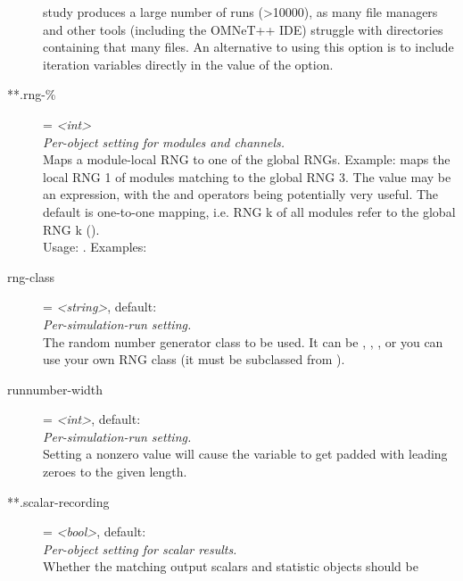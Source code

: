 \begin{description}
    study produces a large number of runs (>10000), as many file managers and
    other tools (including the OMNeT++ IDE) struggle with directories
    containing that many files. An alternative to using this option is to
    include iteration variables directly in the value of the
     option.
\item[**.rng-\%] = \textit{<int>}\\
    \textit{Per-object setting for modules and channels.}\\
    Maps a module-local RNG to one of the global RNGs. Example:
    maps the local RNG 1 of modules matching  to the
    global RNG 3. The value may be an expression, with the  and
     operators being potentially very useful. The
    default is one-to-one mapping, i.e. RNG k of all modules refer to the
    global RNG k ().\\
    Usage:
    .
    Examples:
\item[rng-class] = \textit{<string>}, default: \\
    \textit{Per-simulation-run setting.}\\
    The random number generator class to be used. It can be
    , , , or you can use
    your own RNG class (it must be subclassed from ).
\item[runnumber-width] = \textit{<int>}, default: \\
    \textit{Per-simulation-run setting.}\\
    Setting a nonzero value will cause the  variable to get
    padded with leading zeroes to the given length.
\item[**.scalar-recording] = \textit{<bool>}, default: \\
    \textit{Per-object setting for scalar results.}\\
    Whether the matching output scalars and statistic objects should be

\end{description}
